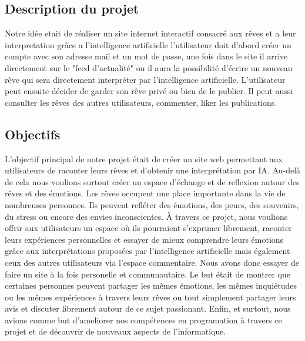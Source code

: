 \documentclass[a4paper, 12pt, twoside]{article}
\begin{document}
	\subsection{Description du projet}
Notre idée etait de réaliser un site internet interactif consacré aux rêves et a leur interpretation grâce a l'intelligence artificielle l'utilisateur doit d'abord créer un compte avec son adresse mail et un mot de passe, une fois dans le site il arrive directement sur le "feed d'actualité" ou il aura la possibilité d'écrire un nouveau rêve qui sera directement interpréter par l'intelligence artificielle. L'utilisateur peut ensuite décider de garder son rêve privé ou bien de le publier. Il peut aussi consulter les rêves des autres utilisateurs, commenter, liker les publications. 

    
	\subsection{Objectifs}
L'objectif principal de notre projet était de créer un site web permettant aux utilisateurs de raconter leurs rêves et d'obtenir une interprétation par IA. Au-delà de cela nous voulions surtout créer un espace d'échange et de reflexion autour des rêves et des émotions. Les rêves occupent une place importante dans la vie de nombreuses personnes. Ils peuvent refléter des émotions, des peurs, des souvenirs, du stress ou encore des envies inconscientes. À travers ce projet, nous voulions offrir aux utilisateurs un espace où ils pourraient s’exprimer librement, raconter leurs expériences personnelles et essayer de mieux comprendre leurs émotions grâce aux interprétations proposées par l’intelligence artificielle mais également ceux des autres utilisateurs via l'espace commentaire. Nous avons donc essayer de faire un site à la fois personelle et communautaire. Le but était de montrer que certaines personnes peuvent partager les mêmes émotions, les mêmes inquiétudes ou les mêmes expériences à travers leurs rêves ou tout simplement partager leurs avis et discuter librement autour de ce sujet passionant. Enfin, et surtout, nous avions comme but d'ameliorer nos compétences en programation à travers ce projet et de découvrir de nouveaux aspects de l'informatique.
\end{document}
